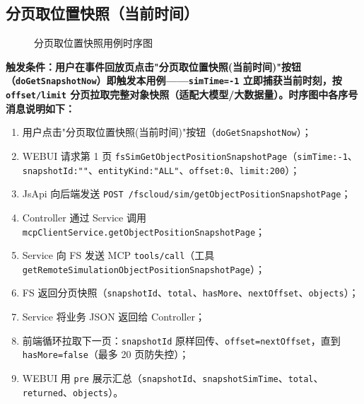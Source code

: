 \subsection{分页取位置快照（当前时间）}\label{sec:getSnapshotPage}
\begin{figure}[!h]
	\centering
	\resizebox{1.0\linewidth}{!}{}
	\caption{分页取位置快照用例时序图}\label{fig:getSnapshotPage}
\end{figure}
\bf{触发条件}：用户在事件回放页点击"分页取位置快照(当前时间)"按钮（\texttt{doGetSnapshotNow}）即触发本用例——\texttt{simTime=-1} 立即捕获当前时刻，按 \texttt{offset/limit} 分页拉取完整对象快照（适配大模型/大数据量）。时序图中各序号消息说明如下：
\begin{enumerate}[label=\arabic*)]
	\item 用户点击"分页取位置快照(当前时间)"按钮（\texttt{doGetSnapshotNow}）；
	\item WEBUI 请求第 1 页 \texttt{fsSimGetObjectPositionSnapshotPage}（\texttt{simTime:-1}、\texttt{snapshotId:""}、\texttt{entityKind:"ALL"}、\texttt{offset:0}、\texttt{limit:200}）；
	\item JsApi 向后端发送 \texttt{POST /fscloud/sim/getObjectPositionSnapshotPage}；
	\item Controller 通过 Service 调用 \texttt{mcpClientService.getObjectPositionSnapshotPage}；
	\item Service 向 FS 发送 MCP \texttt{tools/call}（工具 \texttt{getRemoteSimulationObjectPositionSnapshotPage}）；
	\item FS 返回分页快照（\texttt{snapshotId}、\texttt{total}、\texttt{hasMore}、\texttt{nextOffset}、\texttt{objects}）；
	\item Service 将业务 JSON 返回给 Controller；
	\item 前端循环拉取下一页：\texttt{snapshotId} 原样回传、\texttt{offset=nextOffset}，直到 \texttt{hasMore=false}（最多 20 页防失控）；
	\item WEBUI 用 \texttt{pre} 展示汇总（\texttt{snapshotId}、\texttt{snapshotSimTime}、\texttt{total}、\texttt{returned}、\texttt{objects}）。
\end{enumerate}
\newpage
